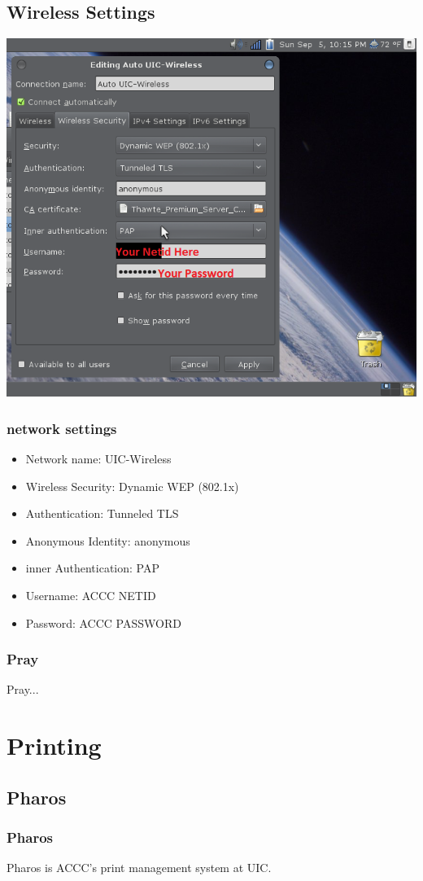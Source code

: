 \documentclass[hyperref={pdfpagelabels=false}]{beamer}
\begin{document}
\subsection{Wireless Settings}
\frame
{
     \includegraphics[totalheight=0.8\textheight]{uicwirelessstep2.png}
}
\frame
{
    \frametitle{network settings}
    \begin{itemize}
    \item{Network name: UIC-Wireless}
    \item{Wireless Security: Dynamic WEP (802.1x)}
    \item{Authentication: Tunneled TLS}
    \item{Anonymous Identity: anonymous}
    \item{inner Authentication: PAP}
    \item{Username: ACCC NETID}
    \item{Password: ACCC PASSWORD}
    \end{itemize}
}
\frame
{
    \frametitle{Pray}
    Pray...
}
\section{Printing}
\subsection{Pharos}
\frame
{
    \frametitle{Pharos}
    Pharos is ACCC's print management system at UIC.
}
\end{document}

